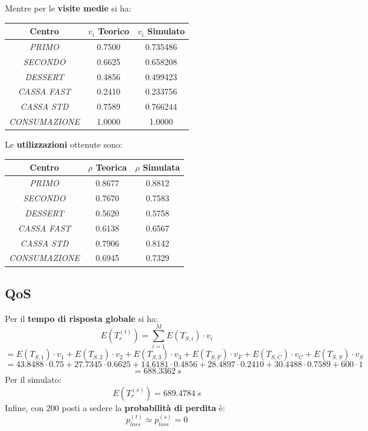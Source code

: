 \documentclass{article}
\begin{document}
Mentre per le \textbf{visite medie} si ha:
\begin{center}\label{tab:visite_ext_1}
\begin{tabular}{|c|c|c|}
 \hline
 \textbf{Centro} & $v_i$ \textbf{Teorico} & $v_i$ \textbf{Simulato}\\
 \hline
 \textit{PRIMO} & 0.7500 & 0.735486\\
 \hline
 \textit{SECONDO} & 0.6625 & 0.658208\\
 \hline
 \textit{DESSERT} & 0.4856 & 0.499423\\
 \hline
 \textit{CASSA FAST} & 0.2410 & 0.233756\\
 \hline
 \textit{CASSA STD} & 0.7589 & 0.766244\\
 \hline
 \textit{CONSUMAZIONE} & 1.0000 & 1.0000\\
 \hline
\end{tabular}
\end{center}

Le \textbf{utilizzazioni} ottenute sono:
\begin{center}\label{tab:rho_ext_1}
\begin{tabular}{|c|c|c|}
 \hline
 \textbf{Centro} & $\rho$ \textbf{Teorica} & $\rho$ \textbf{Simulata}\\
 \hline
 \textit{PRIMO} & 0.8677 & 0.8812\\
 \hline
 \textit{SECONDO} & 0.7670 & 0.7583\\
 \hline
 \textit{DESSERT} & 0.5620 & 0.5758\\
 \hline
 \textit{CASSA FAST} & 0.6138 & 0.6567\\
 \hline
 \textit{CASSA STD} & 0.7906 & 0.8142\\
 \hline
 \textit{CONSUMAZIONE} & 0.6945 & 0.7329\\
 \hline
\end{tabular}
\end{center}

\subsection{QoS}

Per il \textbf{tempo di risposta globale} si ha: 
\[E(T_{r}^{(t)}) = \sum_{i=1}^{M} E(T_{S,i}) \cdot v_{i} \]
\[= E(T_{S,1}) \cdot v_1+ E(T_{S,2}) \cdot v_{2} + E(T_{S,3}) \cdot v_{3} + E(T_{S,F}) \cdot v_{F} + E(T_{S,C}) \cdot v_{C} + E(T_{S,S}) \cdot v_{S}\]
\[=  43.8488 \cdot 0.75 + 27.7345 \cdot 0.6625 + 14.6181 \cdot 0.4856 + 28.4897 \cdot 0.2410 + 30.4488 \cdot 0.7589 + 600 \cdot 1\]
\[ = 688.3362\ s\]
Per il simulato: 
\[E(T_{r}^{(s)}) = 689.4784\ s\]
Infine, con 200 posti a sedere la \textbf{probabilità di perdita} è:
\[p_{loss}^{(t)} \simeq p_{loss}^{(s)} = 0 \]
\end{document}
